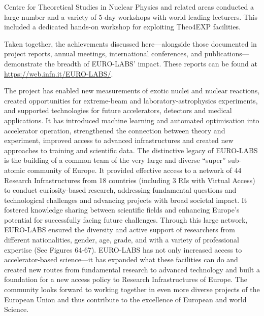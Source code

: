 Centre for Theoretical Studies in Nuclear Physics and related areas conducted a large number and a variety of  5-day workshops with world leading lecturers. This included a dedicated hands-on workshop for exploiting  Theo4EXP facilities.


Taken together, the achievements discussed here—alongside those documented in project reports, annual meetings, international conferences, and publications—demonstrate the breadth of EURO-LABS’ impact. These reports  can be found at 
\url{https://web.infn.it/EURO-LABS/}.

The project has enabled new measurements of exotic nuclei and nuclear reactions, created opportunities for extreme-beam and laboratory-astrophysics experiments, and supported technologies for future accelerators, detectors and medical applications. It has introduced machine learning and automated optimisation into accelerator operation, strengthened the connection between theory and experiment, improved access to advanced infrastructures and created new approaches to training and scientific data.
The distinctive legacy of EURO-LABS is the building of a common team of the very large and diverse “super” sub-atomic community of Europe. It provided effective access to a network of 44 Research Infrastructures from 18 countries (including 3 RIs with Virtual Access) to conduct curiosity-based research, addressing fundamental questions and technological challenges and advancing projects with broad societal impact. It fostered knowledge sharing between scientific fields and enhancing Europe’s potential for successfully facing future challenges. Through this large network, EURO-LABS ensured the diversity and active support of researchers from different nationalities, gender, age, grade, and with a variety of professional expertise (See Figures 64-67). EURO-LABS has not only increased access to accelerator-based science—it has expanded what these facilities can do and created new routes from fundamental research to advanced technology and built a foundation for a new access policy to Research Infrastructures of Europe. The community looks forward to working together in even more diverse projects of the European Union and thus contribute to the excellence of European and world Science. 


